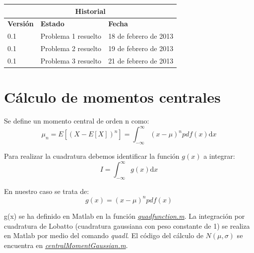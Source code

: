 \documentclass[a4paper,11pt]{article}
\begin{document}
\vspace{2cm}
\begin{center}
\begin{tabular}{|p{2.5cm}|p{3.5cm}|p{3.5cm}|}
\hline
\multicolumn{3}{|c|}{\textbf{Historial}}\\
\hline
\hline
\textbf{Versi\'on} & \textbf{Estado} & \textbf{Fecha}\\
\hline
0.1 & Problema 1 resuelto & 18 de febrero de 2013\\
\hline
0.1 & Problema 2 resuelto & 19 de febrero de 2013\\
\hline
0.1 & Problema 3 resuelto & 21 de febrero de 2013\\
\hline
\end{tabular}
\end{center}

\newpage
\mbox{}
\thispagestyle{empty}
\pagebreak

\setcounter{page}{1}
\pagebreak

\setcounter{tocdepth}{3}
\tableofcontents
\pagebreak
\listoftables
\listoffigures
\lstlistoflistings
\pagebreak

\setcounter{page}{1}

\pagebreak
\section{C\'alculo de momentos centrales}

Se define un momento central de orden n como:\\
\begin{equation*}
   \mu_n = E [(X- E[X])^n] = \int_{-\infty}^\infty (x - \mu)^n pdf(x)\mathrm{d}x
\end{equation*}

Para realizar la cuadratura debemos identificar la funci\'on $g(x)$ a
integrar:\\
\begin{equation*}
   I = \int_{-\infty}^\infty g(x)\mathrm{d}x
\end{equation*}

En nuestro caso se trata de:\\
\begin{equation*}
   g(x) = (x - \mu)^n pdf(x)
\end{equation*}

g(x) se ha definido en Matlab en la funci\'on
\hyperref[quadfunc]{\textit{quadfunction.m}}. La integraci\'on por cuadratura de
Lobatto (cuadratura gaussiana con peso constante de 1) se realiza en Matlab por
medio del comando \textit{quadl}. El c\'odigo del c\'alculo de
$N(\mu, \sigma)$ se encuentra en
\hyperref[centralMomentQuad]{\textit{centralMomentGaussian.m}}.
\end{document}
